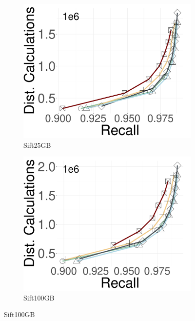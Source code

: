 \begin{figure}[ht]
\begin{subfigure}{0.28\columnwidth}
			\centering
			\captionsetup{justification=centering}	
			\includegraphics[width=\textwidth]{../img/oigas/RND_RRND/DC_SIFT25GB.pdf}
   \caption{{Sift25GB}}
		\label{fig:ND:sift25GB}
		\end{subfigure}	
  \hspace{0.4cm}
		\begin{subfigure}{0.28\columnwidth}
			\centering
			\captionsetup{justification=centering}	
			\includegraphics[width=\textwidth]{../img/oigas/RND_RRND/DC_SIFT100GB.pdf}
             \caption{{Sift100GB}}
		      \label{fig:ND:sift100GB}
		\end{subfigure}	

\end{figure}
